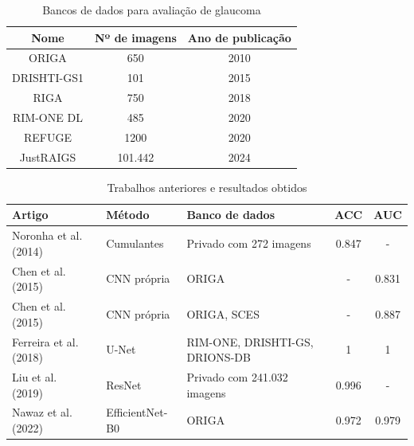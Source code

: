 \documentclass[12pt]{article}
\begin{document}
\begin{table}[htb]
    \centering
    \begin{tabular}{|c|c|c|}
    \hline
    Nome & Nº de imagens & Ano de publicação \\
    \hline
    ORIGA & 650 & 2010 \\
    \hline
    DRISHTI-GS1 & 101 & 2015 \\
    \hline
    RIGA & 750 & 2018 \\
    \hline
    RIM-ONE DL & 485 & 2020 \\
    \hline
    REFUGE & 1200 & 2020 \\
    \hline
    JustRAIGS & 101.442 & 2024 \\
    \hline
    \end{tabular}
    \caption{Bancos de dados para avaliação de glaucoma}
    \label{tab:datasets}
\end{table}

\begin{table}[htb]
    \centering
    \begin{tabular}{|l|l|p{3cm}|c|c|}
    \hline
    \textbf{Artigo} & \textbf{Método} & \textbf{Banco de dados} & \textbf{ACC} & \textbf{AUC} \\
    \hline
    Noronha et al. (2014)~\cite{noronha2014hoc} & Cumulantes  & Privado com 272 imagens        & 0.847 &  -    \\
    \hline
    Chen et al. (2015)~\cite{chen2015cnn}       & CNN própria & ORIGA                          & -     & 0.831 \\
    \hline
    Chen et al. (2015)~\cite{chen2015cnn}       & CNN própria & ORIGA, SCES                    & -     & 0.887 \\
    \hline
    Ferreira et al. (2018)~\cite{ferreira_cnn_2018} & U-Net   & RIM-ONE, DRISHTI-GS, DRIONS-DB & 1     & 1     \\
    \hline
    Liu et al. (2019)~\cite{liu_cnn_2019}       & ResNet      & Privado com 241.032 imagens    & 0.996 & -     \\
    \hline
    Nawaz et al. (2022)~\cite{nawaz_efficient_2022} & EfficientNet-B0 & ORIGA                  & 0.972 & 0.979 \\
    \hline
    \end{tabular}
    \caption{Trabalhos anteriores e resultados obtidos}
    \label{tab:trabalhos}
\end{table}

\bigskip
\end{document}
